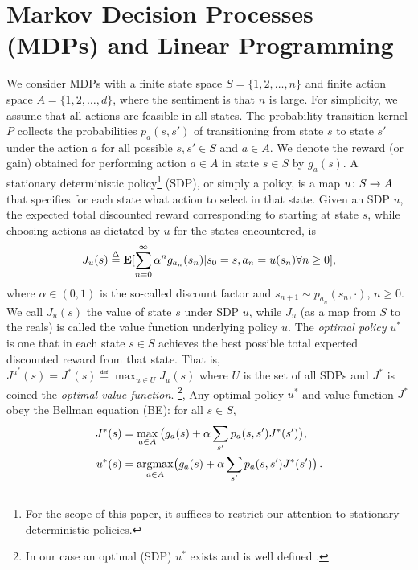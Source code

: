 \section{Markov Decision Processes (MDPs) and Linear Programming}
We consider MDPs with a finite state space $S=\{1,2,\ldots,n\}$ and finite action space $A=\{1,2,\ldots,d\}$, where the sentiment is that $n$ is large. For simplicity, we assume that all actions are feasible in all states. The probability transition kernel $P$ collects the probabilities $p_a(s,s')$ of transitioning from state $s$ to state $s'$ under the action $a$ for all possible $s,s'\in S$ and $a\in A$. We denote the reward (or gain) obtained for performing action $a\in A$ in state $s\in S$ by $g_a(s)$.
A stationary deterministic policy\footnote{For the scope of this paper, it suffices to restrict our attention to stationary deterministic policies.} (SDP), or simply a policy, is a map $u\colon S\rightarrow A$ that specifies for each state what action to select in that state.
Given an SDP $u$, the expected total discounted reward corresponding to starting at state $s$, while choosing actions as dictated by $u$ for the states encountered, is
\begin{align}
J_u(s)\stackrel{\Delta}{=}\mathbf{E}[\sum_{n=0}^\infty \alpha^n g_{a_n}(s_n)|s_0=s,a_n=u(s_n)\relax{ }\forall n\geq 0],\nonumber
\end{align}
where $\alpha \in (0,1)$ is the so-called discount factor and $s_{n+1} \sim p_{a_n}(s_n,\cdot)$, $n\ge 0$. 
We call $J_u(s)$ the value of state $s$ under SDP $u$, while $J_u$ (as a map from $S$ to the reals)
is called the value function underlying policy $u$.
The \emph{optimal policy} $u^*$ is one that in each state $s\in S$ achieves the best possible total expected discounted reward from that state. That is, $J^{u^*}(s) = J^*(s) \eqdef \max_{u\in U} J_u(s)$
where $U$ is the set of all SDPs and $J^*$ is coined the \emph{optimal value function}.%
\footnote{In our case an optimal (SDP) $u^*$ exists and is well defined \cite{BertB}.}, 
Any optimal policy $u^*$ and value function $J^*$ obey the Bellman equation (BE): for all $ s \in S$,
\begin{subequations}\label{bell}
\begin{align}
\label{bellval}J^*(s)&=\max_{ a\in A}\big(g_a(s)+\alpha \sum_{s'}p_a(s,s')J^*(s')\big),\\
\label{bellpol}u^*(s)&= \underset{a\in A}{\argmax}\big(g_a(s)+\alpha \sum_{s'}p_a(s,s')J^*(s')\big)\,.
\end{align}
\end{subequations}
